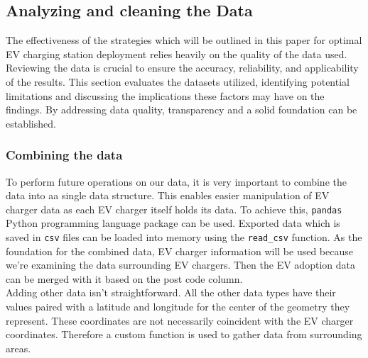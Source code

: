 \subsection{Analyzing and cleaning the Data}\label{sec:47}
The effectiveness of the strategies which will be outlined in this paper for optimal EV charging station deployment relies heavily on the quality of the data used. Reviewing the data is crucial to ensure the accuracy, reliability, and applicability of the results. This section evaluates the datasets utilized, identifying potential limitations and discussing the implications these factors may have on the findings. By addressing data quality, transparency and a solid foundation can be established.\\
\subsubsection{Combining the data}
To perform future operations on our data, it is very important to combine the data into aa single data structure. This enables easier manipulation of EV charger data as each EV charger itself holds its data. To achieve this, \verb|pandas| Python programming language package can be used. Exported data which is saved in \verb|csv| files can be loaded into memory using the \verb|read_csv| function. As the foundation for the combined data, EV charger information will be used because we're examining the data surrounding EV chargers. Then the EV adoption data can be merged with it based on the post code column.\\
Adding other data isn't straightforward. All the other data types have their values paired with a latitude and longitude for the center of the geometry they represent. These coordinates are not necessarily coincident with the EV charger coordinates. Therefore a custom function is used to gather data from surrounding areas.
